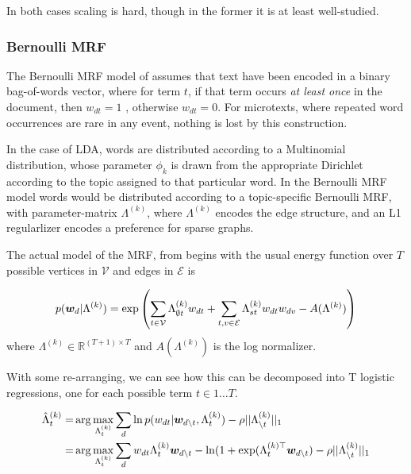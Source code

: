 In both cases scaling is hard, though in the former it is at least well-studied.

\subsubsection*{Bernoulli MRF}
The Bernoulli MRF model of \cite{Nallapati2007} assumes that text have been encoded in a binary bag-of-words vector, where for term $t$, if that term occurs \emph{at least once} in the document, then $w_{dt} = 1$ , otherwise $w_{dt} = 0$. For microtexts, where repeated word occurrences are rare in any event, nothing is lost by this construction.

In the case of LDA, words are distributed according to a Multinomial distribution, whose parameter $\phi_k$ is drawn from the appropriate Dirichlet according to the topic assigned to that particular word. In the Bernoulli MRF model words would be distributed according to a topic-specific Bernoulli MRF, with parameter-matrix $\Lambda^{(k)}$, where $\Lambda^{(k)}$ encodes the edge structure, and an L1 regularlizer encodes a preference for sparse graphs.

\newcommand \vertices { { \mathcal{V} } }
\newcommand \edges    { { \mathcal{E} } }

The actual model of the MRF, from  begins with the usual energy function over $T$ possible vertices in $\vertices$ and edges in $\edges$ is

\begin{equation}
p(\vv{w}_d|\Lambda^{(k)}) = \exp\left(
    \sum_{t\in\vertices}\Lambda^{(k)}_{\emptyset t} w_{dt}
    + \sum_{t,v \in \edges}\Lambda^{(k)}_{st} w_{dt} w_{dv}
    - A(\Lambda^{(k)})
\right)
\end{equation}
where $\Lambda^{(k)} \in \mathbb{R}^{(T+1) \times T}$ and $A(\Lambda^{(k)})$ is the log normalizer. 

With some re-arranging, we can see how this can be decomposed into T logistic regressions, one for each possible term $t \in {1\ldots T}$. 

\begin{align}
\hat{\Lambda}^{(k)}_t = & \arg \max_{\Lambda^{(k)}_t} \sum_d \ln p(w_{dt}|\bm w_{d \setminus t}, \Lambda^{(k)}_t) - \rho ||\Lambda^{(k)}_{\setminus t}||_1 \\
 = &  \arg \max_{\Lambda^{(k)}_t} \sum_d w_{dt} \Lambda^{(k)}_t \bm w_{d \setminus t} - \ln(1 + \exp(\Lambda_t^{(k)\top}\bm w_{d \setminus t}) - \rho ||\Lambda^{(k)}_{\setminus t}||_1
\end{align}

